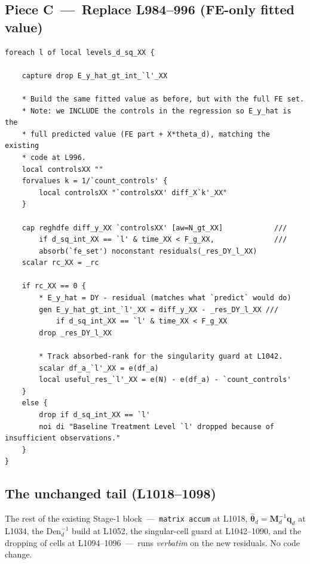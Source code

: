 \documentclass[11pt]{article}
\newcommand{\code}[1]{\texttt{\small #1}}
\newcommand{\1}{\mathbb{1}}
\newcommand{\thetad}{\widehat{\bm{\theta}}_d}
\begin{document}
\subsection*{Piece C \,---\, Replace L984--996 (FE-only fitted value)}

\begin{lstlisting}
foreach l of local levels_d_sq_XX {

    capture drop E_y_hat_gt_int_`l'_XX

    * Build the same fitted value as before, but with the full FE set.
    * Note: we INCLUDE the controls in the regression so E_y_hat is the
    * full predicted value (FE part + X*theta_d), matching the existing
    * code at L996.
    local controlsXX ""
    forvalues k = 1/`count_controls' {
        local controlsXX "`controlsXX' diff_X`k'_XX"
    }

    cap reghdfe diff_y_XX `controlsXX' [aw=N_gt_XX]            ///
        if d_sq_int_XX == `l' & time_XX < F_g_XX,              ///
        absorb(`fe_set') noconstant residuals(_res_DY_l_XX)
    scalar rc_XX = _rc

    if rc_XX == 0 {
        * E_y_hat = DY - residual (matches what `predict` would do)
        gen E_y_hat_gt_int_`l'_XX = diff_y_XX - _res_DY_l_XX ///
            if d_sq_int_XX == `l' & time_XX < F_g_XX
        drop _res_DY_l_XX

        * Track absorbed-rank for the singularity guard at L1042.
        scalar df_a_`l'_XX = e(df_a)
        local useful_res_`l'_XX = e(N) - e(df_a) - `count_controls'
    }
    else {
        drop if d_sq_int_XX == `l'
        noi di "Baseline Treatment Level `l' dropped because of insufficient observations."
    }
}
\end{lstlisting}

\subsection*{The unchanged tail (L1018--1098)}

\begin{tcolorbox}[colback=codebg, colframe=ok, boxrule=0.6pt, arc=1pt]
The rest of the existing Stage-1 block \,---\, \code{matrix accum} at
L1018, $\thetad = \bm{M}_d^{-1}\bm{q}_d$ at L1034, the
$\mathrm{Den}_d^{-1}$ build at L1052, the singular-cell guard at L1042--1090,
and the dropping of cells at L1094--1096 \,---\, runs \emph{verbatim} on the
new residuals. No code change.
\end{tcolorbox}
\end{document}
